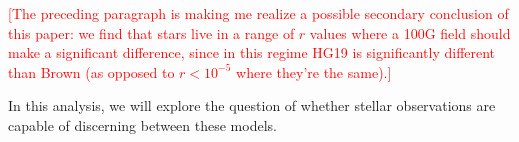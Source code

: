 \textcolor{red}{[The preceding paragraph is making me realize a possible secondary conclusion of this paper: we find that stars live in a range of $r$ values where a 100G field should make a significant difference, since in this regime HG19 is significantly different than Brown (as opposed to $r < 10^{-5}$ where they're the same).]}


In this analysis, we will explore the question of whether stellar observations %
are capable of discerning between these models. 

